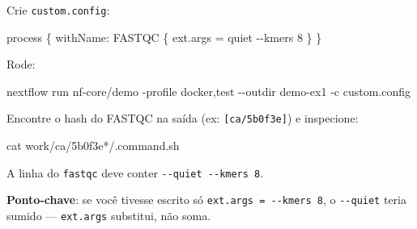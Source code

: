 \documentclass[
  brazilian,
  letterpaper,
  DIV=11,
  numbers=noendperiod]{scrreprt}
\newenvironment{Shaded}{\begin{snugshade}}{\end{snugshade}}
\newcommand{\AttributeTok}[1]{\textcolor[rgb]{0.40,0.45,0.13}{#1}}
\newcommand{\ExtensionTok}[1]{\textcolor[rgb]{0.00,0.23,0.31}{#1}}
\newcommand{\FunctionTok}[1]{\textcolor[rgb]{0.28,0.35,0.67}{#1}}
\newcommand{\NormalTok}[1]{\textcolor[rgb]{0.00,0.23,0.31}{#1}}
\newcommand{\OperatorTok}[1]{\textcolor[rgb]{0.37,0.37,0.37}{#1}}
\newcommand{\PreprocessorTok}[1]{\textcolor[rgb]{0.68,0.00,0.00}{#1}}
\newcommand{\StringTok}[1]{\textcolor[rgb]{0.13,0.47,0.30}{#1}}
\begin{document}
\begin{tcolorbox}[enhanced jigsaw, arc=.35mm, bottomrule=.15mm, bottomtitle=1mm, breakable, colback=white, colbacktitle=quarto-callout-tip-color!10!white, colframe=quarto-callout-tip-color-frame, coltitle=black, left=2mm, leftrule=.75mm, opacityback=0, opacitybacktitle=0.6, rightrule=.15mm, title=\textcolor{quarto-callout-tip-color}{\faLightbulb}\hspace{0.5em}{Resposta}, titlerule=0mm, toprule=.15mm, toptitle=1mm]

Crie \texttt{custom.config}:

\begin{Shaded}
\begin{Highlighting}[]
\NormalTok{process }\OperatorTok{\{}
\NormalTok{    withName}\OperatorTok{:} \StringTok{\textquotesingle{}FASTQC\textquotesingle{}} \OperatorTok{\{}
\NormalTok{        ext}\OperatorTok{.}\NormalTok{args }\OperatorTok{=} \StringTok{\textquotesingle{}{-}{-}quiet {-}{-}kmers 8\textquotesingle{}}
    \OperatorTok{\}}
\OperatorTok{\}}
\end{Highlighting}
\end{Shaded}

Rode:

\begin{Shaded}
\begin{Highlighting}[]
\ExtensionTok{nextflow}\NormalTok{ run nf{-}core/demo }\AttributeTok{{-}profile}\NormalTok{ docker,test }\AttributeTok{{-}{-}outdir}\NormalTok{ demo{-}ex1 }\AttributeTok{{-}c}\NormalTok{ custom.config}
\end{Highlighting}
\end{Shaded}

Encontre o hash do FASTQC na saída (ex: \texttt{{[}ca/5b0f3e{]}}) e
inspecione:

\begin{Shaded}
\begin{Highlighting}[]
\FunctionTok{cat}\NormalTok{ work/ca/5b0f3e}\PreprocessorTok{*}\NormalTok{/.command.sh}
\end{Highlighting}
\end{Shaded}

A linha do \texttt{fastqc} deve conter \texttt{-\/-quiet\ -\/-kmers\ 8}.

\textbf{Ponto-chave}: se você tivesse escrito só
\texttt{ext.args\ =\ \textquotesingle{}-\/-kmers\ 8\textquotesingle{}},
o \texttt{-\/-quiet} teria sumido --- \texttt{ext.args} substitui, não
soma.

\end{tcolorbox}
\end{document}
